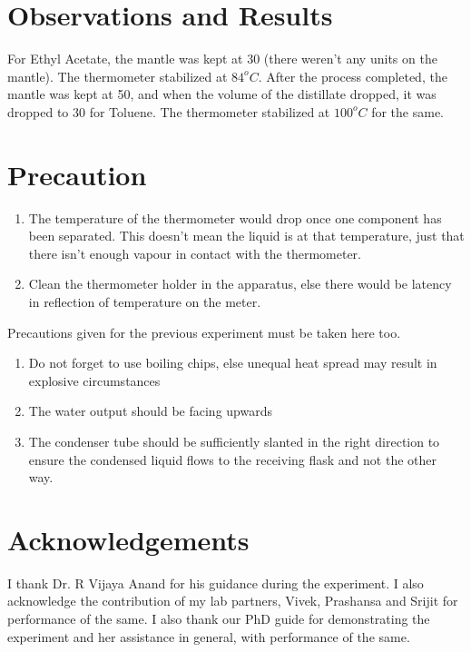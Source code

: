 \section{Observations and Results}
	For Ethyl Acetate, the mantle was kept at 30 (there weren't any units on the mantle). The thermometer stabilized at $84 ^o C$.
	After the process completed, the mantle was kept at 50, and when the volume of the distillate dropped, it was dropped to 30 for Toluene. The thermometer stabilized at $100 ^o C$ for the same.

\section{Precaution}
	\begin{enumerate}
		\item The temperature of the thermometer would drop once one component has been separated. This doesn't mean the liquid is at that temperature, just that there isn't enough vapour in contact with the thermometer.
		\item Clean the thermometer holder in the apparatus, else there would be latency in reflection of temperature on the meter.
	\end{enumerate}
	Precautions given for the previous experiment must be taken here too.
	\begin{enumerate}
		\item Do not forget to use boiling chips, else unequal heat spread may result in explosive circumstances
		\item The water output should be facing upwards
		\item The condenser tube should be sufficiently slanted in the right direction to ensure the condensed liquid flows to the receiving flask and not the other way.
	\end{enumerate}

	
\section{Acknowledgements}
I thank Dr. R Vijaya Anand for his guidance during the experiment. I also acknowledge the contribution of my lab partners, Vivek, Prashansa and Srijit for performance of the same. I also thank our PhD guide for demonstrating the experiment and her assistance in general, with performance of the same.


